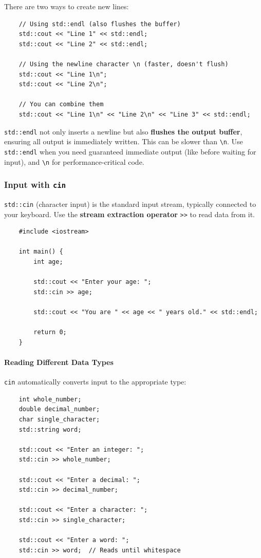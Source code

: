 There are two ways to create new lines:

\begin{lstlisting}
	// Using std::endl (also flushes the buffer)
	std::cout << "Line 1" << std::endl;
	std::cout << "Line 2" << std::endl;
	
	// Using the newline character \n (faster, doesn't flush)
	std::cout << "Line 1\n";
	std::cout << "Line 2\n";
	
	// You can combine them
	std::cout << "Line 1\n" << "Line 2\n" << "Line 3" << std::endl;
\end{lstlisting}

\begin{remark}
	\texttt{std::endl} not only inserts a newline but also \textbf{flushes the output buffer}, ensuring all output is immediately written. This can be slower than \texttt{\textbackslash n}. Use \texttt{std::endl} when you need guaranteed immediate output (like before waiting for input), and \texttt{\textbackslash n} for performance-critical code.
\end{remark}

\subsubsection{Input with \texttt{cin}}

\texttt{std::cin} (character input) is the standard input stream, typically connected to your keyboard. Use the \textbf{stream extraction operator} \texttt{>>} to read data from it.

\begin{lstlisting}
	#include <iostream>
	
	int main() {
		int age;
		
		std::cout << "Enter your age: ";
		std::cin >> age;
		
		std::cout << "You are " << age << " years old." << std::endl;
		
		return 0;
	}
\end{lstlisting}

\paragraph{Reading Different Data Types}

\texttt{cin} automatically converts input to the appropriate type:

\begin{lstlisting}
	int whole_number;
	double decimal_number;
	char single_character;
	std::string word;
	
	std::cout << "Enter an integer: ";
	std::cin >> whole_number;
	
	std::cout << "Enter a decimal: ";
	std::cin >> decimal_number;
	
	std::cout << "Enter a character: ";
	std::cin >> single_character;
	
	std::cout << "Enter a word: ";
	std::cin >> word;  // Reads until whitespace
\end{lstlisting}

